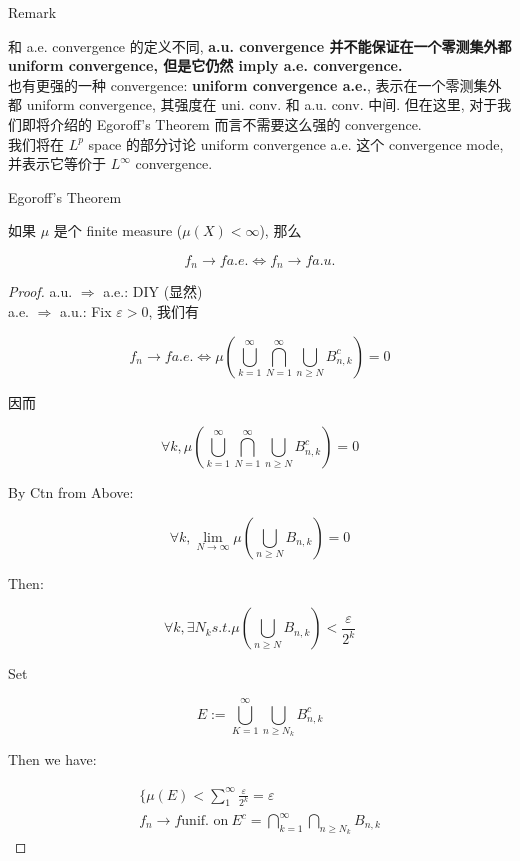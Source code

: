 \documentclass{qlnotes-export}
\begin{document}
\begin{qlremark}{Remark}

和 a.e. convergence 的定义不同, \textbf{a.u. convergence 并不能保证在一个零测集外都 uniform convergence, 但是它仍然 imply a.e. convergence.}\\
也有更强的一种 convergence: \textbf{uniform convergence a.e.}, 表示在一个零测集外都 uniform convergence, 其强度在 uni. conv. 和 a.u. conv. 中间. 但在这里, 对于我们即将介绍的 Egoroff's Theorem 而言不需要这么强的 convergence.\\
我们将在 \(L^{p}\) space 的部分讨论 uniform convergence a.e. 这个 convergence mode, 并表示它等价于 \(L^{\infty}\) convergence.

\end{qlremark}

\begin{theorem}{Egoroff's Theorem}\label{thm-05-integration-of-real-and-complex-functions-egoroff-s-theorem}

如果 \(\mu\) 是个 finite measure (\(\mu(X) < \infty\)), 那么

\[f_{n}\rightarrow f a.e.\Leftrightarrow f_{n}\rightarrow f a.u.\]

\end{theorem}

\begin{proof}

a.u. \(\Longrightarrow\) a.e.: DIY (显然)\\
a.e. \(\Longrightarrow\) a.u.: Fix \(\varepsilon > 0\), 我们有

\[f_{n}\rightarrow f a.e.\Leftrightarrow\mu(\bigcup\limits_{k = 1}^{\infty}\bigcap\limits_{N = 1}^{\infty}\bigcup\limits_{n \geq N}B_{n,k}^{c}) = 0\]

因而

\[\forall k,\mu(\bigcup\limits_{k = 1}^{\infty}\bigcap\limits_{N = 1}^{\infty}\bigcup\limits_{n \geq N}B_{n,k}^{c}) = 0\]

By Ctn from Above:

\[\forall k,\lim\limits_{N\rightarrow\infty}\mu(\bigcup\limits_{n \geq N}B_{n,k}) = 0\]

Then:

\[\forall k,\exists N_{k} s.t.\mu(\bigcup\limits_{n \geq N}B_{n,k}) < \frac{\varepsilon}{2^{k}}\]

Set

\[E := \bigcup\limits_{K = 1}^{\infty}\bigcup\limits_{n \geq N_{k}}B_{n,k}^{c}\]

Then we have:

\[\begin{matrix}
{\{\mu(E) < \sum\limits_{1}^{\infty}\frac{\varepsilon}{2^{k}} = \varepsilon} \\
{f_{n}\rightarrow f\text{unif. on}\ E^{c} = \bigcap\limits_{k = 1}^{\infty}\bigcap\limits_{n \geq N_{k}}B_{n,k}}
\end{matrix}\]

\end{proof}
\end{document}
